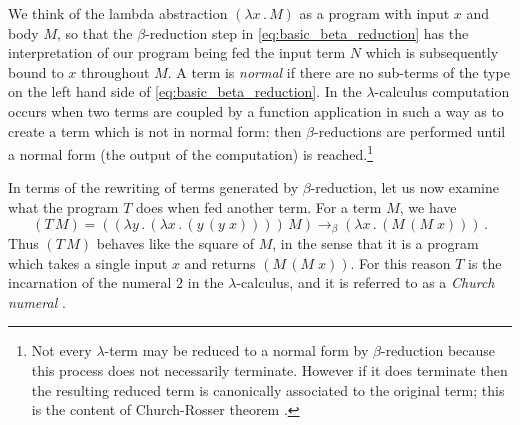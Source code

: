 \documentclass[english,letter paper,12pt,reqno]{article}
\theoremstyle{example}
\numberwithin{equation}{section}
\def\inta{\bold{int}}
\begin{document}
We think of the lambda abstraction $(\lambda x \,.\, M)$ as a program with input $x$ and body $M$, so that the $\beta$-reduction step in \eqref{eq:basic_beta_reduction} has the interpretation of our program being fed the input term $N$ which is subsequently bound to $x$ throughout $M$. A term is \emph{normal} if there are no sub-terms of the type on the left hand side of \eqref{eq:basic_beta_reduction}. In the $\lambda$-calculus computation occurs when two terms are coupled by a function application in such a way as to create a term which is not in normal form: then $\beta$-reductions are performed until a normal form (the output of the computation) is reached.\footnote{Not every $\lambda$-term may be reduced to a normal form by $\beta$-reduction because this process does not necessarily terminate. However if it does terminate then the resulting reduced term is canonically associated to the original term; this is the content of Church-Rosser theorem \cite[\S 4.2]{selinger}.}

In terms of the rewriting of terms generated by $\beta$-reduction, let us now examine what the program $T$ does when fed another term. For a term $M$, we have
\begin{equation}\label{eq:beta_reduc_dup}
(T \, M) = (( \lambda y \,.\, ( \lambda x \,.\, (y \,(y \; x))))\, M) \longrightarrow_\beta (\lambda x \, . \, (M \, (M \; x)))\,.
\end{equation}
Thus $(T \, M)$ behaves like the square of $M$, in the sense that it is a program which takes a single input $x$ and returns $(M \, (M \; x))$. For this reason $T$ is the incarnation of the numeral $2$ in the $\lambda$-calculus, and it is referred to as a \emph{Church numeral} \cite[\S 3.2]{selinger}.
\end{document}
